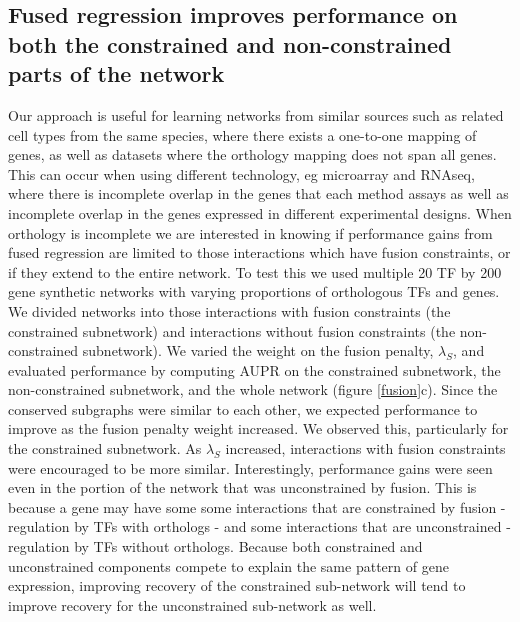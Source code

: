\documentclass[11pt]{article}
\begin{document}
\subsection{Fused regression improves performance on both the constrained and non-constrained parts of the network}
Our approach is useful for learning networks from similar sources such as related cell types from the same species, where there exists a one-to-one mapping of genes, as well as datasets where the orthology mapping does not span all genes. 
This can occur when using different technology, eg microarray and RNAseq, where there is incomplete overlap in the genes that each method assays as well as incomplete overlap in the genes expressed in different experimental designs.  
When orthology is incomplete we are interested in knowing if performance gains from fused regression are limited to those interactions which have fusion constraints, or if they extend to the entire network. 
To test this we used multiple 20 TF by 200 gene synthetic networks with varying proportions of orthologous TFs and genes. 
We divided networks into those interactions with fusion constraints (the constrained subnetwork) and interactions without fusion constraints (the non-constrained subnetwork). 
We varied the weight on the fusion penalty, $\lambda_S$, and evaluated performance by computing AUPR on the constrained subnetwork, the non-constrained subnetwork, and the whole network (figure \ref{fusion}c). 
Since the conserved subgraphs were similar to each other, we expected performance to improve as the fusion penalty weight increased. 
We observed this, particularly for the constrained subnetwork. 
As $\lambda_S$ increased, interactions with fusion constraints were encouraged to be more similar. 
Interestingly, performance gains were seen even in the portion of the network that was unconstrained by fusion. This is because a gene may have some some interactions that are constrained by fusion - regulation by TFs with orthologs - and some interactions that are unconstrained - regulation by TFs without orthologs. Because both constrained and unconstrained components compete to explain the same pattern of gene expression, improving recovery of the constrained sub-network will tend to improve recovery for the unconstrained sub-network as well.
\end{document}
